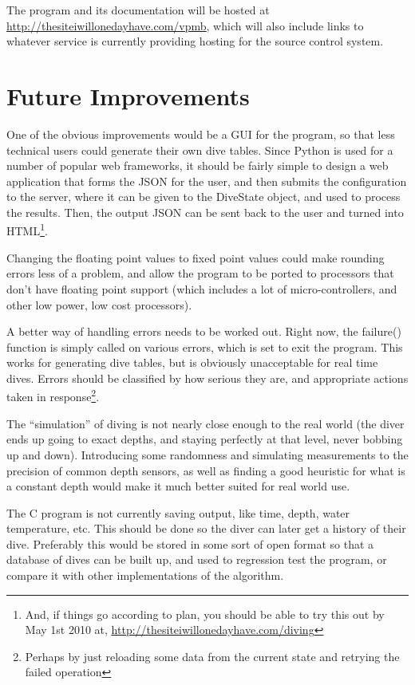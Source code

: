 \documentclass[12pt]{article}
\begin{document}
The program and its documentation will be hosted at \\{\color{blue}\uline{\href{http://thesiteiwillonedayhave.com/vpmb}{http://thesiteiwillonedayhave.com/vpmb}}}, which will also include links to whatever service is currently
providing hosting for the source control system.

\section{Future Improvements}

One of the obvious improvements would be a GUI for the program, so that less technical users could
generate their own dive tables. Since Python is used for a number of popular web frameworks,
it should be fairly simple to design a web application that forms the JSON for the user,
and then submits the configuration to the server, where it can be given to the DiveState
object, and used to process the results. Then, the output JSON can be sent back to the user
and turned into HTML\footnote{And, if things go according to plan, you should be able to try this
out by May 1st 2010 at, {\color{blue}\uline{\href{http://thesiteiwillonedayhave.com/diving}{http://thesiteiwillonedayhave.com/diving}}}}.

Changing the floating point values to fixed point values could make rounding errors less of a problem,
and allow the program to be ported to processors that don't have floating point support (which includes
a lot of micro-controllers, and other low power, low cost processors).

A better way of handling errors needs to be worked out. Right now, the failure() function is simply
called on various errors, which is set to exit the program. This works for generating dive tables,
but is obviously unacceptable for real time dives. Errors should be classified by how serious
they are, and appropriate actions taken in response\footnote{Perhaps by just reloading some data
from the current state and retrying the failed operation}.

The ``simulation'' of diving is not nearly close enough to the real world (the diver ends
up going to exact depths, and staying perfectly at that level, never bobbing up and down). Introducing
some randomness and simulating measurements to the precision of common depth sensors, as well as
finding a good heuristic for what is a constant depth would make it much better suited for real world use.

The C program is not currently saving output, like time, depth, water temperature, etc. This should be
done so the diver can later get a history of their dive. Preferably this would be stored in some
sort of open format so that a database of dives can be built up, and used to regression test the
program, or compare it with other implementations of the algorithm.
\end{document}
